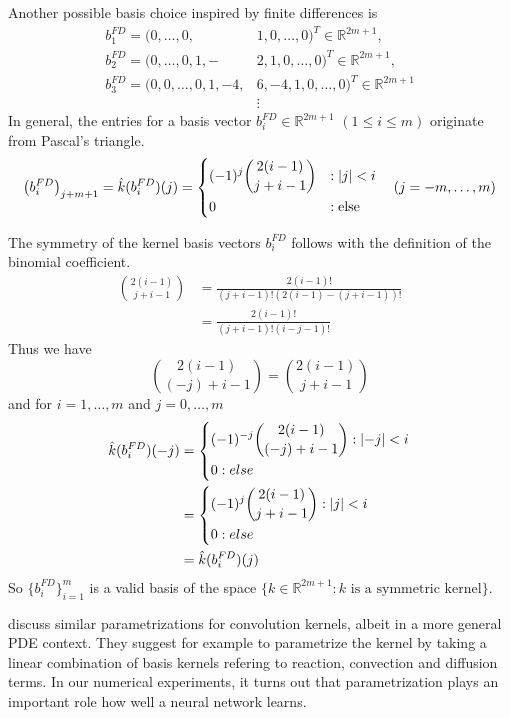 \documentclass[twoside,a4paper]{article}
\begin{document}
Another possible basis choice inspired by finite differences is
\begin{align*}
	b_1^{FD} = (0, \dots, 0,& 1,0, \dots, 0)^T \in \mathbb{R}^{2m+1},\\
	b_2^{FD} = (0, \dots, 0, 1,-&2,1, 0, \dots, 0)^T \in \mathbb{R}^{2m+1},\\
	b_3^{FD} = (0, 0, \dots, 0, 1,-4,& 6,-4,1, 0, \dots, 0)^T \in \mathbb{R}^{2m+1} \\
	&\vdots
\end{align*}
In general, the entries for a basis vector $b_i^{FD} \in \mathbb{R}^{2m+1}$ $(1 \leq i \leq m)$ 
originate from Pascal's triangle.
\begin{equation*}
	\left( b_i^{FD} \right)_{j+m+1} = \hat{k}(b_i^{FD})(j) = \begin{dcases}
		(-1)^j \binom{2(i-1)}{j+i-1} &: \left|{j}\right| < i \\
		0 &: \text{else}
	\end{dcases}
	\quad (j=-m, \dots, m)
\end{equation*}

The symmetry of the kernel basis vectors $b_i^{FD}$ follows with the definition of the binomial coefficient.
\begin{align*}
	\binom{2(i-1)}{j+i-1} &= \frac{2(i-1)!}{(j+i-1)!(2(i-1)-(j+i-1))!} \\
	&= \frac{2(i-1)!}{(j+i-1)!(i-j-1)!}
\end{align*}
Thus we have
\begin{equation*}
	\binom{2(i-1)}{(-j)+i-1} = \binom{2(i-1)}{j+i-1}
\end{equation*}
and for $i=1, \dots, m$ and $j= 0, \dots, m$
\begin{align*}
	\hat{k}(b_i^{FD})(-j) &= \begin{dcases}
		(-1)^{-j} \binom{2(i-1)}{(-j)+i-1} : \left|{-j}\right| < i \\
		0 : else
	\end{dcases} \\
	&= \begin{dcases}
		(-1)^{j} \binom{2(i-1)}{j+i-1} : \left|{j}\right| < i \\
		0 : else
	\end{dcases} \\
	&= \hat{k}(b_i^{FD})(j) 
\end{align*}
So $\{ b_i^{FD} \}_{i=1}^m$ is a valid basis of
the space $\{ k \in \mathbb{R}^{2m+1} : k \text{ is a symmetric kernel} \}$.

\citet{Ruthotto2020} discuss similar parametrizations for
convolution kernels, albeit in a more general PDE context. They
suggest for example to parametrize the kernel by taking a linear combination
of basis kernels refering to reaction, convection and diffusion terms.
In our numerical experiments, it turns out that
parametrization plays an important role how well a neural network learns.
\end{document}
